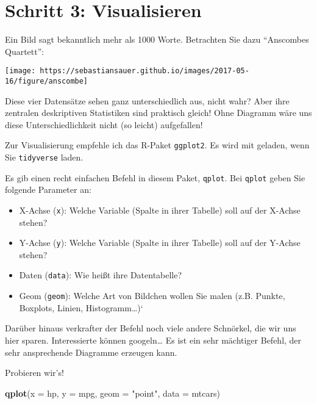 \documentclass[]{article}
\newenvironment{Shaded}{\begin{snugshade}}{\end{snugshade}}
\newcommand{\DataTypeTok}[1]{\textcolor[rgb]{0.13,0.29,0.53}{#1}}
\newcommand{\KeywordTok}[1]{\textcolor[rgb]{0.13,0.29,0.53}{\textbf{#1}}}
\newcommand{\NormalTok}[1]{#1}
\newcommand{\StringTok}[1]{\textcolor[rgb]{0.31,0.60,0.02}{#1}}
\providecommand{\tightlist}{%
  \setlength{\itemsep}{0pt}\setlength{\parskip}{0pt}}
\begin{document}
\hypertarget{schritt-3-visualisieren}{%
\section{Schritt 3: Visualisieren}\label{schritt-3-visualisieren}}

Ein Bild sagt bekanntlich mehr als 1000 Worte. Betrachten Sie dazu
``Anscombes Quartett'':

\begin{center}\texttt{[image: https://sebastiansauer.github.io/images/2017-05-16/figure/anscombe]} \end{center}

Diese vier Datensätze sehen ganz unterschiedlich aus, nicht wahr? Aber
ihre zentralen deskriptiven Statistiken sind praktisch gleich! Ohne
Diagramm wäre uns diese Unterschiedlichkeit nicht (so leicht)
aufgefallen!

Zur Visualisierung empfehle ich das R-Paket \texttt{ggplot2}. Es wird
mit geladen, wenn Sie \texttt{tidyverse} laden.

Es gib einen recht einfachen Befehl in diesem Paket, \texttt{qplot}. Bei
\texttt{qplot} geben Sie folgende Parameter an:

\begin{itemize}
\tightlist
\item
  X-Achse (\texttt{x}): Welche Variable (Spalte in ihrer Tabelle) soll
  auf der X-Achse stehen?\\
\item
  Y-Achse (\texttt{y}): Welche Variable (Spalte in ihrer Tabelle) soll
  auf der Y-Achse stehen?
\item
  Daten (\texttt{data}): Wie heißt ihre Datentabelle?
\item
  Geom (\texttt{geom}): Welche Art von Bildchen wollen Sie malen (z.B.
  Punkte, Boxplots, Linien, Histogramm\ldots{})`
\end{itemize}

Darüber hinaus verkrafter der Befehl noch viele andere Schnörkel, die
wir uns hier sparen. Interessierte können googeln\ldots{} Es ist ein
sehr mächtiger Befehl, der sehr ansprechende Diagramme erzeugen kann.

Probieren wir's!

\begin{Shaded}
\begin{Highlighting}[]
\KeywordTok{qplot}\NormalTok{(}\DataTypeTok{x =}\NormalTok{ hp,}
      \DataTypeTok{y =}\NormalTok{ mpg,}
      \DataTypeTok{geom =} \StringTok{"point"}\NormalTok{,}
      \DataTypeTok{data =}\NormalTok{ mtcars)}
\end{Highlighting}
\end{Shaded}
\end{document}
